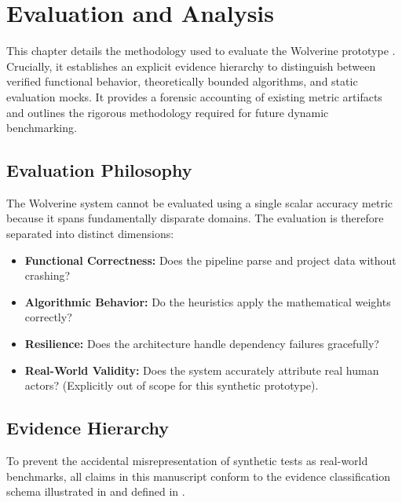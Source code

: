 \chapter{Evaluation and Analysis}
\label{ch:evaluation}

This chapter details the methodology used to evaluate the Wolverine prototype \cite{christen2012data}. Crucially, it establishes an explicit evidence hierarchy to distinguish between verified functional behavior, theoretically bounded algorithms, and static evaluation mocks. It provides a forensic accounting of existing metric artifacts and outlines the rigorous methodology required for future dynamic benchmarking.

\section{Evaluation Philosophy}
\label{sec:eval-philosophy}
The Wolverine system cannot be evaluated using a single scalar accuracy metric because it spans fundamentally disparate domains. The evaluation is therefore separated into distinct dimensions:
\begin{itemize}
    \item \textbf{Functional Correctness:} Does the pipeline parse and project data without crashing?
    \item \textbf{Algorithmic Behavior:} Do the heuristics apply the mathematical weights correctly?
    \item \textbf{Resilience:} Does the architecture handle dependency failures gracefully?
    \item \textbf{Real-World Validity:} Does the system accurately attribute real human actors? (Explicitly out of scope for this synthetic prototype).
\end{itemize}

\section{Evidence Hierarchy}
\label{sec:eval-hierarchy}
To prevent the accidental misrepresentation of synthetic tests as real-world benchmarks, all claims in this manuscript conform to the evidence classification schema illustrated in  and defined in .

